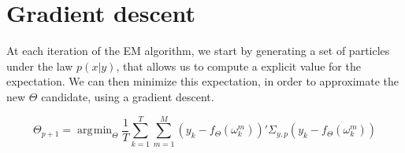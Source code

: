\documentclass[10pt,a4paper]{report}
\DeclareMathOperator*{\argmin}{\arg\!\min}
\begin{document}
\section{Gradient descent}
At each iteration of the EM algorithm, we start by generating a set of particles under the law $p(x|y)$, that allows us to compute a explicit value for the expectation. We can then minimize this expectation, in order to approximate the new $\Theta$ candidate, using a gradient descent.

$$
    \Theta_{p+1} = \argmin_{\Theta} \frac{1}{T}\sum_{k=1}^T \sum_{m=1}^M (y_k - f_{\Theta}(\omega_k^m))' \Sigma_{y, p} (y_k - f_{\Theta}(\omega_k^m))
$$
\end{document}
